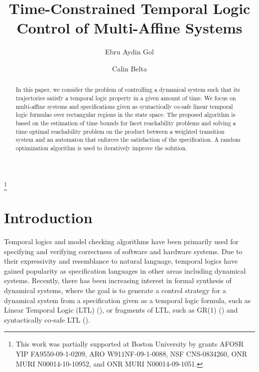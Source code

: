 \documentclass{ifacconf}
\begin{document}
\begin{frontmatter}

\title{Time-Constrained Temporal Logic Control of Multi-Affine Systems}
\thanks[footnoteinfo]{This work was partially supported at Boston University by grants AFOSR YIP FA9550-09-1-0209, ARO W911NF-09-1-0088, NSF CNS-0834260, ONR 
MURI N00014-10-10952, and ONR MURI N00014-09-1051.}

\author[First]{Ebru Aydin Gol}
\author[First]{Calin Belta}

\address[First]{Boston University, Boston, MA 02215, USA \\e-mail: \{ebru,cbelta\}@bu.edu}                                              


\begin{abstract}
In this paper, we consider the problem of controlling a dynamical system such that its trajectories satisfy a temporal logic property in a given amount of time. We focus on multi-affine systems and specifications given as syntactically co-safe linear temporal logic formulas over rectangular regions in the state space. The proposed algorithm is based on the estimation of time bounds for facet reachability problems and solving a time optimal reachability problem on the product between a weighted transition system and an automaton that enforces the satisfaction of the specification. A random optimization algorithm is used to iteratively improve the solution. 
\end{abstract}
\end{frontmatter}


\section{Introduction}\label{sec:intro}
Temporal logics and model checking algorithms have been primarily used for specifying and verifying correctness of software and hardware systems. 
Due to their expressivity and resemblance to natural language, temporal logics have gained popularity as specification languages in other areas including dynamical systems. Recently, there has been increasing interest in formal synthesis of dynamical systems, where the goal is to generate a control strategy for a dynamical system from a specification given as a temporal logic formula, such as Linear Temporal Logic (LTL)  (\cite{Kloetzer:2008,TP03,Girard:2010}), or fragments of LTL, such as  
GR(1) (\cite{Hadas-ICRA07,Tok-Ufuk-Murray-CDC09}) and syntactically co-safe LTL (\cite{Kavraki:MPlanning}).
\end{document}
